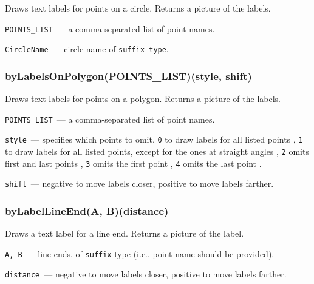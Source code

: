 	Draws text labels for points on a circle. Returns a picture of the labels.
	
	\texttt{POINTS\_LIST}~— a comma-separated list of point names.
	
	\texttt{CircleName}~— circle name of \texttt{suffix type}.

\subsubsection{byLabelsOnPolygon(POINTS\_LIST)(style, shift)}\label{byLabelsOnPolygon}
	
	Draws text labels for points on a polygon. Returns a picture of the labels.
	
	
	\texttt{POINTS\_LIST}~— a comma-separated list of point names.
	
	\texttt{style}~— specifies which points to omit. \texttt{0} to draw labels for all listed points
	, \texttt{1} to draw labels for all listed points, except for the ones at straight angles
	, \texttt{2} omits first and last points
	, \texttt{3} omits the first point
	, \texttt{4} omits the last point
	.
	
	\texttt{shift}~— negative to move labels closer, positive to move labels farther.

\subsubsection{byLabelLineEnd(A, B)(distance)}\label{byLabelLineEnd}
	
	Draws a text label for a line end. Returns a picture of the label.
	
	\texttt{A, B}~— line ends, of \texttt{suffix} type (i.e., point name should be provided).
	
	\texttt{distance}~— negative to move labels closer, positive to move labels farther.


